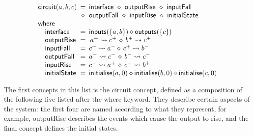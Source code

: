 \documentclass[british, journal]{IEEEtran}
\begin{document}
\vspace{-3mm}
\[
\begin{array}{lcl}
\mathsf{circuit}(a,b,c)&\hspace{-2mm}=&\hspace{-2mm}\mathsf{interface}~\diamond~\mathsf{outputRise}~\diamond~\mathsf{inputFall}\\
~&\hspace{-2mm}\diamond&\hspace{-2mm}\mathsf{outputFall}~\diamond~\mathsf{inputRise}~\diamond~\mathsf{initialState}\\
\mathsf{where}&~&\\
\,\,\,\,\,\,\mathsf{interface}&\hspace{-2mm}=&\hspace{-2mm}\mathsf{inputs}(\{a,b\})\diamond\mathsf{outputs}(\{c\})\\
\,\,\,\,\,\,\mathsf{outputRise}&\hspace{-2mm}=&\hspace{-2mm}\,a^{+}\rightsquigarrow
c^{+}\,\diamond\, b^{+}\rightsquigarrow c^{+}\\
\,\,\,\,\,\,\mathsf{inputFall}&\hspace{-2mm}=&\hspace{-2mm}c ^ {+}
\rightsquigarrow a^{-} \diamond\, c ^ {+} \rightsquigarrow b^{-}\\
\,\,\,\,\,\,\mathsf{outputFall}&\hspace{-2mm}=&\hspace{-2mm}a^{-}
\rightsquigarrow c^{-} \,\diamond\, b^{-} \rightsquigarrow c^{-}\\
\,\,\,\,\,\,\mathsf{inputRise}&\hspace{-2mm}=&\hspace{-2mm}c^{-}
\rightsquigarrow a^{+} \,\diamond\, c^{-} \rightsquigarrow b^{+}\\
\,\,\,\,\,\,\mathsf{initialState}&\hspace{-2mm}=&\hspace{-2mm}\mathsf{initialise}(a,0)
\diamond \mathsf{initialise}(b,0) \diamond \mathsf{initialise}(c,0)\\
\end{array}
\]

The first concepts in this list is the \textsf{circuit} concept, defined as a
composition of the following five listed after the \textsf{where} keyword.
They describe certain aspects of the system: the first four are named
according to what they represent, for example, \textsf{outputRise} describes
the events which cause the output to rise, and the final concept defines
the initial states.
\end{document}
